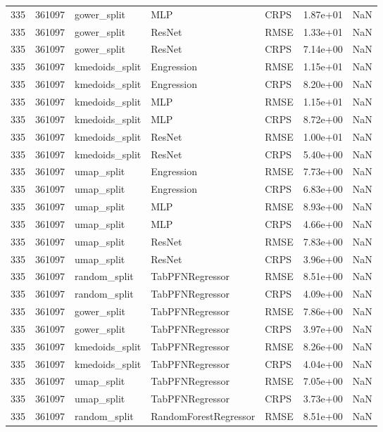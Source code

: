 \begin{tabular}{rrlllrr}
335 & 361097 & gower\_split & MLP & CRPS & 1.87e+01 & NaN \\
335 & 361097 & gower\_split & ResNet & RMSE & 1.33e+01 & NaN \\
335 & 361097 & gower\_split & ResNet & CRPS & 7.14e+00 & NaN \\
335 & 361097 & kmedoids\_split & Engression & RMSE & 1.15e+01 & NaN \\
335 & 361097 & kmedoids\_split & Engression & CRPS & 8.20e+00 & NaN \\
335 & 361097 & kmedoids\_split & MLP & RMSE & 1.15e+01 & NaN \\
335 & 361097 & kmedoids\_split & MLP & CRPS & 8.72e+00 & NaN \\
335 & 361097 & kmedoids\_split & ResNet & RMSE & 1.00e+01 & NaN \\
335 & 361097 & kmedoids\_split & ResNet & CRPS & 5.40e+00 & NaN \\
335 & 361097 & umap\_split & Engression & RMSE & 7.73e+00 & NaN \\
335 & 361097 & umap\_split & Engression & CRPS & 6.83e+00 & NaN \\
335 & 361097 & umap\_split & MLP & RMSE & 8.93e+00 & NaN \\
335 & 361097 & umap\_split & MLP & CRPS & 4.66e+00 & NaN \\
335 & 361097 & umap\_split & ResNet & RMSE & 7.83e+00 & NaN \\
335 & 361097 & umap\_split & ResNet & CRPS & 3.96e+00 & NaN \\
335 & 361097 & random\_split & TabPFNRegressor & RMSE & 8.51e+00 & NaN \\
335 & 361097 & random\_split & TabPFNRegressor & CRPS & 4.09e+00 & NaN \\
335 & 361097 & gower\_split & TabPFNRegressor & RMSE & 7.86e+00 & NaN \\
335 & 361097 & gower\_split & TabPFNRegressor & CRPS & 3.97e+00 & NaN \\
335 & 361097 & kmedoids\_split & TabPFNRegressor & RMSE & 8.26e+00 & NaN \\
335 & 361097 & kmedoids\_split & TabPFNRegressor & CRPS & 4.04e+00 & NaN \\
335 & 361097 & umap\_split & TabPFNRegressor & RMSE & 7.05e+00 & NaN \\
335 & 361097 & umap\_split & TabPFNRegressor & CRPS & 3.73e+00 & NaN \\
335 & 361097 & random\_split & RandomForestRegressor & RMSE & 8.51e+00 & NaN \\

\end{tabular}
